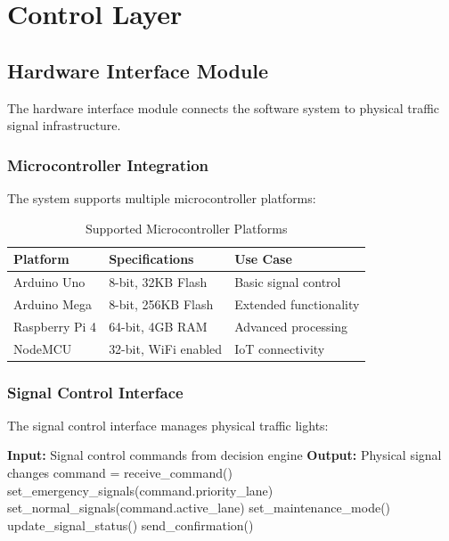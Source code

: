 \section{Control Layer}

\subsection{Hardware Interface Module}

The hardware interface module connects the software system to physical traffic signal infrastructure.

\subsubsection{Microcontroller Integration}

The system supports multiple microcontroller platforms:

\begin{table}[h]
\centering
\caption{Supported Microcontroller Platforms}
\begin{tabular}{|l|l|l|}
\hline
\textbf{Platform} & \textbf{Specifications} & \textbf{Use Case} \\
\hline
Arduino Uno & 8-bit, 32KB Flash & Basic signal control \\
Arduino Mega & 8-bit, 256KB Flash & Extended functionality \\
Raspberry Pi 4 & 64-bit, 4GB RAM & Advanced processing \\
NodeMCU & 32-bit, WiFi enabled & IoT connectivity \\
\hline
\end{tabular}
\end{table}

\subsubsection{Signal Control Interface}

The signal control interface manages physical traffic lights:

\begin{algorithmic}[1]
\STATE \textbf{Input:} Signal control commands from decision engine
\STATE \textbf{Output:} Physical signal changes
\STATE 
\STATE command = receive\_command()
\STATE 
{}
    \STATE set\_emergency\_signals(command.priority\_lane)
    \STATE set\_normal\_signals(command.active\_lane)
    \STATE set\_maintenance\_mode()
\ENDIF
\STATE 
\STATE update\_signal\_status()
\STATE send\_confirmation()
\end{algorithmic}

